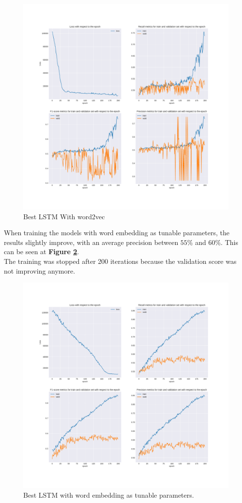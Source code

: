 \begin{figure}
 \centering
 \includegraphics[width=\textwidth]{images/chapitre4/lstm2}
 \caption{Best LSTM With word2vec}
 \label{fig:chap4:lstm2}
\end{figure}
When training the models with word embedding as tunable parameters, the results slightly improve, with an average precision between $55\%$ and $60\%$. This can be seen at \textbf{Figure \ref{fig:chap4:lstm1}}. \\
The training was stopped after 200 iterations because the validation score was not improving anymore. 
\begin{figure}
 \centering
 \includegraphics[width=\textwidth]{images/chapitre4/lstm1}
 \caption{Best LSTM with word embedding as tunable parameters.}
 \label{fig:chap4:lstm1}
\end{figure}

